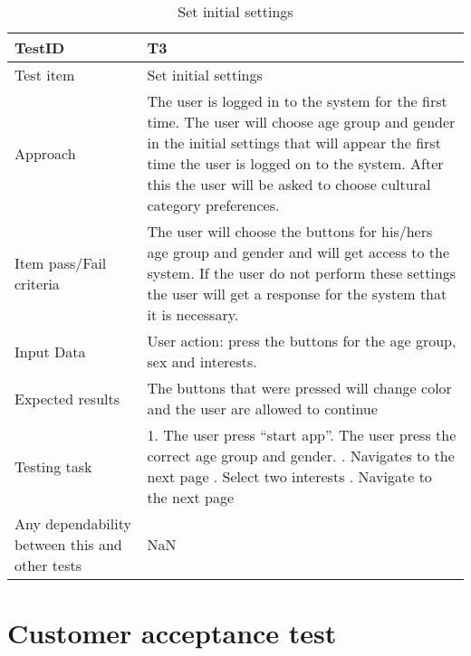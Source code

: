 \begin{table}[!h]
	\begin{center}
		\begin{tabular}{| p{5cm} | p{12cm} |}
			\hline
			TestID & T3 \\ \hline
			Test item & Set initial settings  \\ \hline
			
			Approach & The user is logged in to the system for the first time. The user will choose age group and gender in the initial settings that will appear the first time the user is logged on to the system. After this the user will be asked to choose cultural category preferences.   \\ \hline
			
			Item pass/Fail criteria & The user will choose the buttons for his/hers age group and gender and will get access to the system. If the user do not perform these settings the user will get a response for the system that it is necessary.  \\ \hline
			
			Input Data & User action: press the buttons for the age group, sex and interests.   \\ \hline
			
			Expected results & The buttons that were pressed will change color and the user are allowed to continue   \\ \hline
			
			Testing task & 1. The user press “start app”\newline 2. The user press the correct age group and gender. \newline
			3. Navigates to the next page \newline 4. Select two interests \newline 5. Navigate to the next page  \\ \hline
			
			Any dependability between this and other tests & NaN \\ \hline
		\end{tabular}
	\end{center}
	\caption{Set initial settings}
	\label{Tab_systemtest2}
\end{table}

\section{Customer acceptance test}
\label{sec_acceptance_test}

